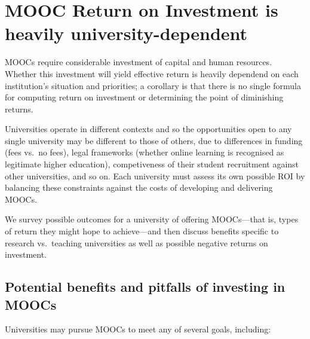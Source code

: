 \section{MOOC Return on Investment is heavily university-dependent}
\label{sec:roi}


MOOCs require considerable investment of capital and human resources.
Whether this investment will yield effective return is heavily dependend
on each institution's situation and priorities; a corollary is that
there is no single formula for computing return on investment or
determining the point of diminishing returns.

Universities operate in different contexts and so the opportunities open
to any single university may be different to those of others, due to
differences in funding (fees vs.\ no fees), legal frameworks (whether online
learning is recognised as legitimate higher education), competiveness of their
student recruitment against other universities, and so on.  Each
university must assess its own possible ROI by balancing these constraints
against the costs of developing and delivering MOOCs.
 
We survey possible outcomes for a university of offering MOOCs---that
is, types of return they might hope to achieve---and then discuss
benefits specific to research vs.\ teaching universities as well as
possible negative returns on investment.

\subsection{Potential benefits and pitfalls of investing in MOOCs}
 
Universities may pursue MOOCs to meet any of several goals, including:

